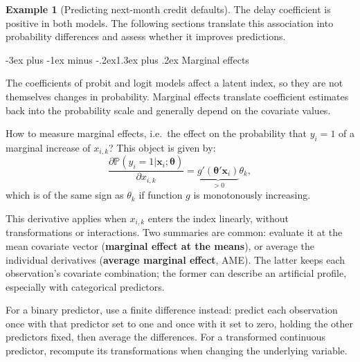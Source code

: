\documentclass[
  11pt,
]{book}
\makeatletter
\renewcommand\section{\@startsection{section}{1}{\z@}
  {-3ex plus -1ex minus -.2ex}{1.3ex plus .2ex}
  {\normalfont\Large\bfseries\color{TextbookInk}}}
\theoremstyle{definition}
\theoremstyle{definition}
\newtheorem{example}{Example}[chapter]
\theoremstyle{definition}
\theoremstyle{definition}
\theoremstyle{remark}
\makeatother
\begin{document}
\begin{example}[Predicting next-month credit defaults]
The delay coefficient is positive in both models. The following sections translate this association into probability differences and assess whether it improves predictions.
\end{example}

\section{Marginal effects}\label{marginalFX}

The coefficients of probit and logit models affect a latent index, so they are not themselves changes in probability. Marginal effects translate coefficient estimates back into the probability scale and generally depend on the covariate values.

How to measure marginal effects, i.e.~the effect on the probability that \(y_i=1\) of a marginal increase of \(x_{i,k}\)? This object is given by:
\[
\frac{\partial \mathbb{P}(y_i=1|\mathbf{x}_i;\boldsymbol\theta)}{\partial x_{i,k}} = \underbrace{g'(\boldsymbol\theta'\mathbf{x}_i)}_{>0}\theta_k,
\]
which is of the same sign as \(\theta_k\) if function \(g\) is monotonously increasing.

This derivative applies when \(x_{i,k}\) enters the index linearly, without transformations or interactions. Two summaries are common: evaluate it at the mean covariate vector (\textbf{marginal effect at the means}), or average the individual derivatives (\textbf{average marginal effect}, AME). The latter keeps each observation's covariate combination; the former can describe an artificial profile, especially with categorical predictors.

For a binary predictor, use a finite difference instead: predict each observation once with that predictor set to one and once with it set to zero, holding the other predictors fixed, then average the differences. For a transformed continuous predictor, recompute its transformations when changing the underlying variable.
\end{document}
